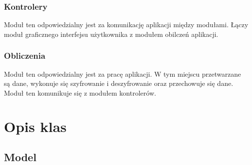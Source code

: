 \documentclass[a4paper]{article}
\begin{document}
\subsubsection{Kontrolery}
Moduł ten odpowiedzialny jest za komunikację aplikacji między modułami. Łączy moduł graficznego interfejsu użytkownika z modułem obilczeń aplikacji.

\subsubsection{Obliczenia}
Moduł ten odpowiedzialny jest za pracę aplikacji. W tym miejscu przetwarzane są dane, wykonuje się szyfrowanie i deszyfrowanie oraz przechowuje się dane. Moduł ten komunikuje się z modułem kontrolerów.

\section{Opis klas}
\subsection{Model}
\end{document}
